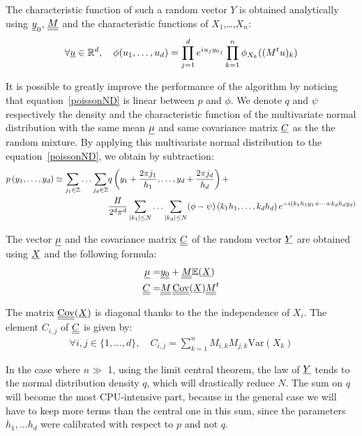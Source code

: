 The characteristic function of such a random vector $Y$ is obtained analytically using ${\underline{y}}_0$, ${\underline{\underline{M}}}$ and the characteristic functions of $X_1$,\dots,$X_n$:
\begin{align}
  \forall {\underline{u}}\in\mathbb{R}^d,\quad\phi(u_1,\hdots,u_d)=\prod_{j=1}^de^{iu_j{y_0}_j}\prod_{k=1}^n\phi_{X_k}((M^tu)_k)
\end{align}

It is possible to greatly improve the performance of the algorithm by noticing that equation~\eqref{poissonND} is linear between $p$
and $\phi $. We denote $q$ and $\psi$ respectively the density and the characteristic function of the multivariate normal distribution with the
same mean ${\underline{\mu}}$ and same covariance matrix ${\underline{C}}$ as the the random mixture. By applying this multivariate normal distribution to the equation~\eqref{poissonND}, we obtain by subtraction:
\begin{align}\label{algoPoisson}
p\left(y_1,\hdots,y_d\right)\simeq \sum_{j_1\in\mathbb{Z}}\hdots\sum_{j_d\in\mathbb{Z}}
  &q\left(y_1+\frac{2\pi j_1}{h_1},\hdots,y_d+\frac{2\pi j_d}{h_d}\right)+\notag\\
  &\frac{H}{2^d\pi^d}\sum_{|k_1|\leq N}\hdots\sum_{|k_d|\leq N}(\phi-\psi)\left(k_1h_1,\hdots,k_dh_d\right)e^{-i(k_1h_1y_1+\cdots+k_dh_dy_d)}
\end{align}

The vector ${\underline{\mu}}$ and the covariance matrix ${\underline{\underline{C}}}$ of the random vector ${\underline{Y}}$ are obtained using ${\underline{X}}$ and the following formula:
\begin{align}
  {\underline{\mu}}=& {\underline{y_0}} + {\underline{\underline{M}}}\mathbb{E}({\underline{X}})\\
  {\underline{\underline{C}}}=&{\underline{\underline{M}}}\,{\underline{\underline{\mathrm{Cov}}}}({\underline{X}}){\underline{\underline{M}}}^t\\
\end{align}

The matrix ${\underline{\underline{\mathrm{Cov}}}}({\underline{X}})$ is diagonal thanks to the the independence of $X_i$.
The element $C_{i,j}$ of ${\underline{\underline{C}}}$ is given by:
\begin{align}
\forall i,j\in\{1,\hdots,d\},\quad C_{i,j}=\sum_{k=1}^nM_{i,k}M_{j,k}\mathrm{Var}(X_k)
\end{align}

In the case where $n \gg $ 1, using the limit central theorem, the law of ${\underline{Y}} $ tends to the normal distribution density $q$,
which will drastically reduce $N$.  The sum on $q$ will become the most CPU-intensive part, because in the general case we will
have to keep more terms than the central one in this sum, since the parameters $ h_1, \dots  h_d$ were calibrated
with respect to $p$ and not $q$.

